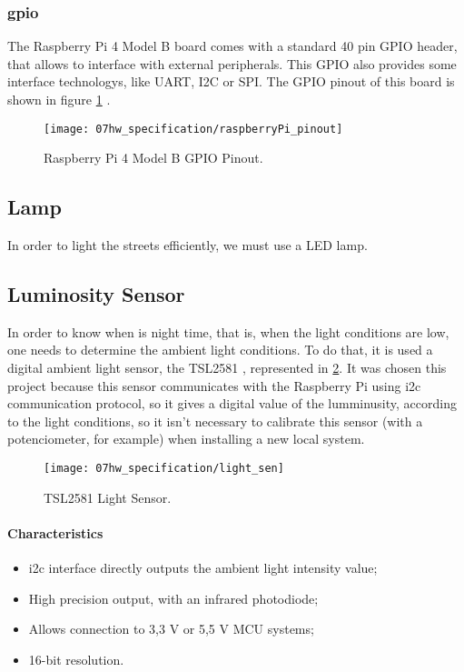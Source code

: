 \subsubsection{\ac{gpio}}

The Raspberry Pi 4 Model B board comes with a standard 40 pin GPIO header, that allows to interface with external peripherals. This GPIO also provides some interface technologys, like UART, I2C or SPI. The GPIO pinout of this board is shown in figure \ref{fig:rasp_pinout} \cite{pinout}.

\begin{figure}[ht]
	\centering
	\texttt{[image: 07hw\_specification/raspberryPi\_pinout]}
	\caption{Raspberry Pi 4 Model B GPIO Pinout.}
	\label{fig:rasp_pinout}
\end{figure}

\subsection{Lamp}

In order to light the streets efficiently, we must use a LED lamp. 

\subsection{Luminosity Sensor}

In order to know when is night time, that is, when the light conditions are low, one needs to determine the ambient light conditions. To do that, it is used a digital ambient light sensor, the TSL2581 \cite{light_sensor}, represented in \ref{fig:light_sen}. It was chosen this project because this sensor communicates with the Raspberry Pi using \ac{i2c} communication protocol, so it gives a digital value of the lumminusity, according to the light conditions, so it isn't necessary to calibrate this sensor (with a potenciometer, for example) when installing a new local system.

\begin{figure}[ht]
	\centering
	\texttt{[image: 07hw\_specification/light\_sen]}
	\caption{TSL2581 Light Sensor.}
	\label{fig:light_sen}
\end{figure}

\paragraph*{Characteristics}
\begin{itemize}
	\item \ac{i2c} interface directly outputs the ambient light intensity value;
	\item High precision output, with an infrared photodiode;
	\item Allows connection to 3,3 V or 5,5 V MCU systems;
	\item 16-bit resolution.
\end{itemize}

